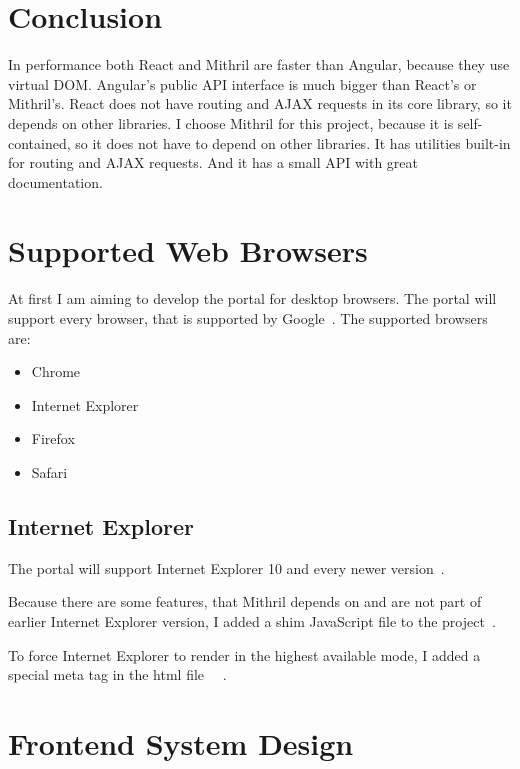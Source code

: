 
\section{Conclusion}
In performance both React and Mithril are faster than Angular, because they use virtual DOM. Angular's public API interface is much bigger than React's or Mithril's. React does not have routing and AJAX requests in its core library, so it depends on other libraries. 
I choose Mithril for this project, because it is  self-contained, so it does not have to depend on other libraries. It has utilities built-in for routing and AJAX requests. And it has a small API with great documentation. 

\section{Supported Web Browsers}
At first I am aiming to develop the portal for desktop browsers. The portal will support every browser, that is supported by Google~\cite{google-support}.
The supported browsers are:
\begin{itemize}
	\item Chrome
	\item Internet Explorer
	\item Firefox
	\item Safari
\end{itemize}

\subsection{Internet Explorer}
The portal will support Internet Explorer 10 and every newer version~\cite{google-support-blog}.

Because there are some features, that Mithril depends on and are not part of earlier Internet Explorer version, I added a shim JavaScript file to the project~\cite{Mithril-tools}. 

To force Internet Explorer to render in the highest available mode, I added a special meta tag in the html file~\cite{IE10-microsoft}~\cite{IE10-html5-boiler} .

\section{Frontend System Design}
\label{frontend-system-design}


